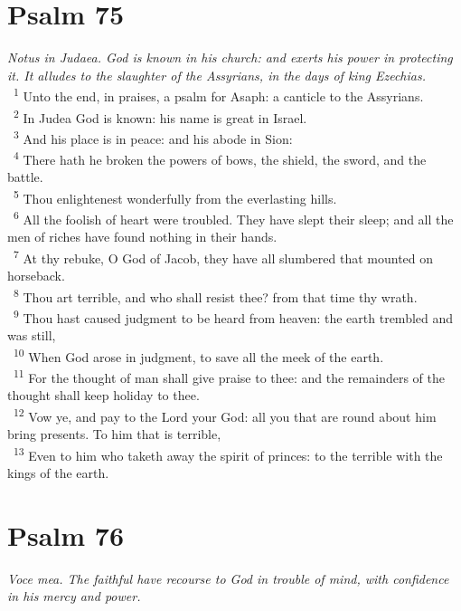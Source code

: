 \documentclass[a5paper,12pt]{article}
\begin{document}
\begin{multicols*}{2}
\section{Psalm 75}
\label{sec:orgc71e32e}
\emph{Notus in Judaea. God is known in his church: and exerts his power in protecting it. It alludes to the slaughter of the Assyrians, in the days of king Ezechias.}\\

~\textsuperscript{1} Unto the end, in praises, a psalm for Asaph: a canticle to the Assyrians.\\
~\textsuperscript{2} In Judea God is known: his name is great in Israel.\\
~\textsuperscript{3} And his place is in peace: and his abode in Sion:\\
~\textsuperscript{4} There hath he broken the powers of bows, the shield, the sword, and the battle.\\
~\textsuperscript{5} Thou enlightenest wonderfully from the everlasting hills.\\
~\textsuperscript{6} All the foolish of heart were troubled. They have slept their sleep; and all the men of riches have found nothing in their hands.\\
~\textsuperscript{7} At thy rebuke, O God of Jacob, they have all slumbered that mounted on horseback.\\
~\textsuperscript{8} Thou art terrible, and who shall resist thee? from that time thy wrath.\\
~\textsuperscript{9} Thou hast caused judgment to be heard from heaven: the earth trembled and was still,\\
~\textsuperscript{10} When God arose in judgment, to save all the meek of the earth.\\
~\textsuperscript{11} For the thought of man shall give praise to thee: and the remainders of the thought shall keep holiday to thee.\\
~\textsuperscript{12} Vow ye, and pay to the Lord your God: all you that are round about him bring presents. To him that is terrible,\\
~\textsuperscript{13} Even to him who taketh away the spirit of princes: to the terrible with the kings of the earth.\\

\section{Psalm 76}
\label{sec:org44344bd}
\emph{Voce mea. The faithful have recourse to God in trouble of mind, with confidence in his mercy and power.}\\


\end{multicols*}
\end{document}

